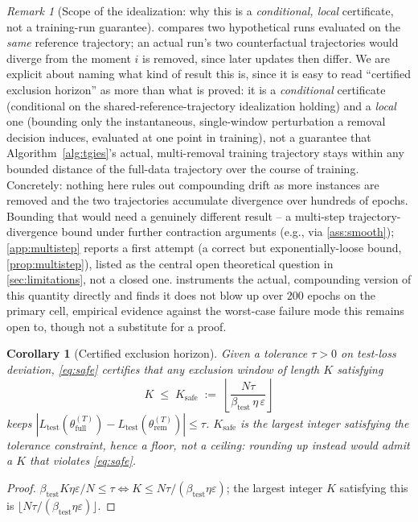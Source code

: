 \documentclass{article}
\theoremstyle{plain}
\newtheorem{corollary}[theorem]{Corollary}
\theoremstyle{definition}
\theoremstyle{remark}
\newtheorem{remark}[theorem]{Remark}
\begin{document}
\begin{remark}[Scope of the idealization: why this is a \emph{conditional, local} certificate, not a training-run guarantee]
\label{rem:shared-traj}
 compares two hypothetical runs evaluated on the \emph{same} reference trajectory; an actual run's two counterfactual trajectories would diverge from the moment $i$ is removed, since later updates then differ. We are explicit about naming what kind of result this is, since it is easy to read ``certified exclusion horizon'' as more than what is proved: it is a \emph{conditional} certificate (conditional on the shared-reference-trajectory idealization holding) and a \emph{local} one (bounding only the instantaneous, single-window perturbation a removal decision induces, evaluated at one point in training), not a guarantee that Algorithm~\ref{alg:tgies}'s actual, multi-removal training trajectory stays within any bounded distance of the full-data trajectory over the course of training. Concretely: nothing here rules out compounding drift as more instances are removed and the two trajectories accumulate divergence over hundreds of epochs. Bounding that would need a genuinely different result -- a multi-step trajectory-divergence bound under further contraction arguments (e.g., via \cref{ass:smooth}); \cref{app:multistep} reports a first attempt (a correct but exponentially-loose bound, \cref{prop:multistep}), listed as the central open theoretical question in \cref{sec:limitations}, not a closed one.  instruments the actual, compounding version of this quantity directly and finds it does not blow up over $200$ epochs on the primary cell, empirical evidence against the worst-case failure mode this remains open to, though not a substitute for a proof.
\end{remark}

\begin{corollary}[Certified exclusion horizon]
\label{cor:kstar}
Given a tolerance $\tau>0$ on test-loss deviation, \cref{eq:safe} certifies that \emph{any} exclusion window of length $K$ satisfying
\begin{equation}
\label{eq:kstar}
K \;\le\; K_{\mathrm{safe}} \;:=\; \left\lfloor \frac{N\tau}{\beta_{\mathrm{test}}\,\eta\,\varepsilon} \right\rfloor
\end{equation}
keeps $|L_{\mathrm{test}}(\theta^{(T)}_{\mathrm{full}})-L_{\mathrm{test}}(\theta^{(T)}_{\mathrm{rem}})|\le\tau$. $K_{\mathrm{safe}}$ is the \emph{largest} integer satisfying the tolerance constraint, hence a floor, not a ceiling: rounding up instead would admit a $K$ that violates \cref{eq:safe}.
\end{corollary}
\begin{proof}
$\beta_{\mathrm{test}}K\eta\varepsilon/N \le \tau \iff K \le N\tau/(\beta_{\mathrm{test}}\eta\varepsilon)$; the largest integer $K$ satisfying this is $\lfloor N\tau/(\beta_{\mathrm{test}}\eta\varepsilon)\rfloor$.
\end{proof}
\end{document}
